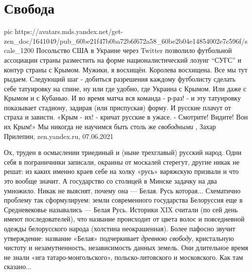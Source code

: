  
 
 
 
 
\chapter{Свобода}
\label{sec:slova.svoboda}

\ifcmt
  pic https://avatars.mds.yandex.net/get-zen_doc/1641049/pub_60be21f47b0ba72b6f672a58_60be2b04e14854002e7c596f/scale_1200
\fi
Посольство США в Украине через Twitter позволило футбольной ассоциации страны
разместить на форме националистический лозунг \enquote{СУГС} и контур страны с Крымом.
Мужики, я восхищён. Королева восхищена. Все мы тут рыдаем. Следующий шаг -
добиться разрешения каждому футболисту сделать себе татуировку на спине, ну или
где удобно, где Украина с Крымом.  Или даже с Крымом и с Кубанью.  И во время
матча вся команда - р-раз! - и эту татуировку показывает стадиону, задирая (или
приспуская) форму. И русские плачут от страха и зависти.  «Крым - их! - кричат
русские в ужасе. - Смотрите! Видите! Вон их Крым!» Мы никогда не научимся быть
столь же \emph{свободными}
, 
Захар Прилепин, zen.yandex.ru, 07.06.2021

Ох, труден в осмыслении триединый и (ныне трехглавый) русский народ. Одни себя
в пограничники записали, окраины от москалей стерегут, другие никак не решат:
из каких именно краев себе на холку «русь» варяжскую призвали и что это вообще
значит. А государство со столицей в Минске задачку на два умножило. Никак не
выяснят, почему она — Белая. Русь которая... Схематично проблему так
сформулируем: земли современного государства Белоруссия еще в Средневековье
назывались — Белая Русь. Историки XIX считали (по сей день имеют
последователей), что название происходит от цвета волос и повседневной одежды
белорусского народа (холстина неокрашенная). Более пафосно звучит утверждение:
название «Белая» подчеркивает \emph{древнюю свободу}, кристальную чистоту и
незамутненность, независимость данных земель. Они длительное время не знали
«ига татаро-монгольского», польско-литовского и московского. Как там сказано...

